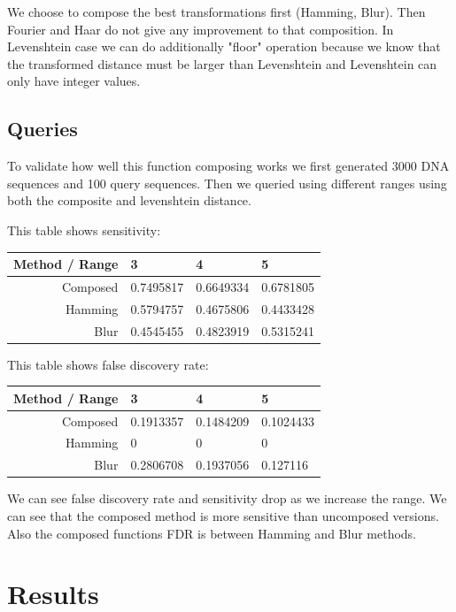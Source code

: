 \documentclass [12pt, a4]{article} %
\begin{document}
We choose to compose the best transformations first (Hamming, Blur). Then Fourier and Haar do not give any improvement to that composition. In Levenshtein case we can do additionally "floor" operation because we know that the transformed distance must be larger than Levenshtein and Levenshtein can only have integer values.

\subsection{Queries}

To validate how well this function composing works we first generated 3000 DNA sequences and 100 query sequences. Then we queried using different ranges using both the composite and levenshtein distance.

This table shows sensitivity:

\begin{table}[H]
\centering
\begin{tabular}{ r | l l l }
Method / Range & 3 & 4 & 5 \\ \hline
Composed & 0.7495817 & 0.6649334 & 0.6781805 \\
Hamming  & 0.5794757 & 0.4675806 & 0.4433428 \\
Blur     & 0.4545455 & 0.4823919 & 0.5315241 \\
\end{tabular}
\end{table}

This table shows false discovery rate:

\begin{table}[H]
\centering
\begin{tabular}{ r | l l l }
Method / Range & 3 & 4 & 5 \\ \hline
Composed & 0.1913357 & 0.1484209 & 0.1024433 \\
Hamming  & 0         & 0         & 0         \\
Blur     & 0.2806708 & 0.1937056 & 0.127116  \\
\end{tabular}
\end{table}

We can see false discovery rate and sensitivity drop as we increase the range.
We can see that the composed method is more sensitive than uncomposed versions.
Also the composed functions FDR is between Hamming and Blur methods.

\section{Results}
\end{document}
